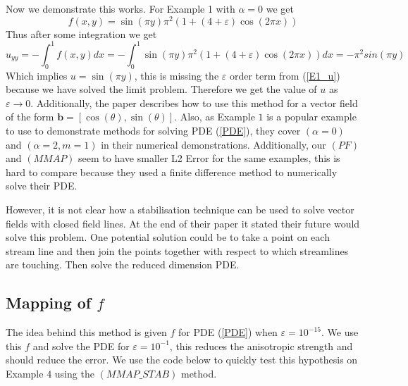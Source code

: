 \documentclass[12pt]{ociamthesis}
\begin{document}
Now we demonstrate this works. For Example 1 with $\alpha = 0$ we get 
\begin{equation}
f(x,y) = \sin(\pi y)\pi^2(1+(4+\varepsilon)\cos(2\pi x)) 
\end{equation}
Thus after some integration we get
\begin{equation}
u_{yy} = - \int_0^1 f(x,y)dx = - \int_0^1 \sin(\pi y)\pi^2(1+(4+\varepsilon)\cos(2\pi x)) dx = -\pi^2 sin(\pi y)
\end{equation}
Which implies $u= \sin(\pi y)$, this is missing the $\varepsilon$ order term from (\ref{E1_u}) because we have solved the limit problem. Therefore we get the value of $u$
 as $\varepsilon \rightarrow 0$. Additionally, the paper \cite{LINE_INT} describes how to use this method for a vector field of the form $\mathbf{b} = [\cos(\theta), \sin(\theta)]$. Also, as Example $1$ is a popular example to use to demonstrate methods for solving PDE (\ref{PDE}), they cover $(\alpha = 0)$ and $(\alpha=2, m=1)$ in their numerical demonstrations. Additionally, our $(PF)$ and $(MMAP)$ seem to have smaller L2 Error for the same examples, this is hard to compare because they used a finite difference method to numerically solve their PDE.
 
 However, it is not clear how a stabilisation technique can be used to solve vector fields with closed field lines. At the end of their paper it stated their future would solve this problem. One potential solution could be to take a point on each stream line and then join the points together with respect to which streamlines are touching. Then solve the reduced dimension PDE.

\subsection{Mapping of $f$} \label{MAP_f}
The idea behind this method is given $f$ for PDE (\ref{PDE}) when $\varepsilon = 10^{-15}$. We use this $f$ and solve the PDE for $\varepsilon = 10^{-1}$, this reduces the anisotropic strength and should reduce the error. We use the code below to quickly test this hypothesis on Example $4$ using the $(MMAP\_STAB)$ method.
\end{document}
